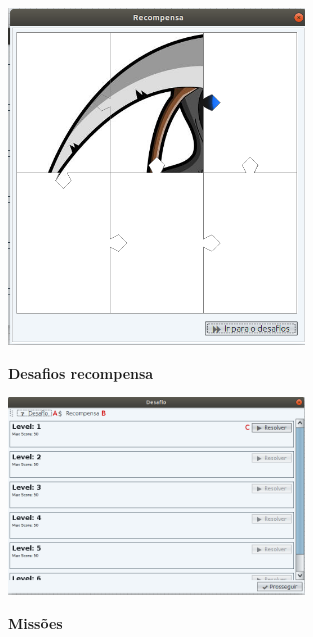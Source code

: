 \documentclass[
	12pt,				%
	oneside,			%
	a4paper,			%
	english,			%
	french,				%
	spanish,			%
	brazil,				%
	]{abntex2}
\begin{document}
\begin{figure}[H]
\centering
\caption{\textbf{Desafios recompensa}}
\includegraphics[width=0.7\textwidth]{imagens/visnode_desafios_recompensa.png}
\sourceAuthor
\label{fig:visnodeDesafiosRecompensa}
\end{figure}


\begin{figure}[H]
\centering
\caption{\textbf{Missões}}
\includegraphics[width=0.7\textwidth]{imagens/visnode_missoes.png}
\sourceAuthor
\label{fig:visnodeMissoes}
\end{figure}
\end{document}
